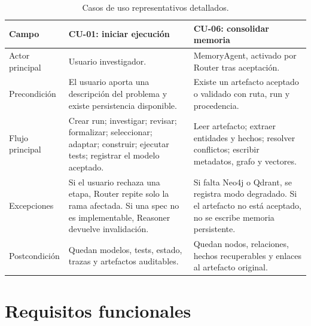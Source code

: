 \begin{table}[H]
\begin{center}
\footnotesize
\begin{tabular}{|>{\raggedright\arraybackslash}p{2.3cm}|>{\raggedright\arraybackslash}p{4.8cm}|>{\raggedright\arraybackslash}p{4.8cm}|} \hline
\textbf{Campo} & \textbf{CU-01: iniciar ejecución} & \textbf{CU-06: consolidar memoria} \\ \hline
Actor principal & Usuario investigador. & MemoryAgent, activado por Router tras aceptación. \\ \hline
Precondición & El usuario aporta una descripción del problema y existe persistencia disponible. & Existe un artefacto aceptado o validado con ruta, run y procedencia. \\ \hline
Flujo principal & Crear run; investigar; revisar; formalizar; seleccionar; adaptar; construir; ejecutar tests; registrar el modelo aceptado. & Leer artefacto; extraer entidades y hechos; resolver conflictos; escribir metadatos, grafo y vectores. \\ \hline
Excepciones & Si el usuario rechaza una etapa, Router repite solo la rama afectada. Si una spec no es implementable, Reasoner devuelve invalidación. & Si falta Neo4j o Qdrant, se registra modo degradado. Si el artefacto no está aceptado, no se escribe memoria persistente. \\ \hline
Postcondición & Quedan modelos, tests, estado, trazas y artefactos auditables. & Quedan nodos, relaciones, hechos recuperables y enlaces al artefacto original. \\ \hline
\end{tabular}
\caption{Casos de uso representativos detallados.}
\end{center}
\end{table}

\section{Requisitos funcionales}

